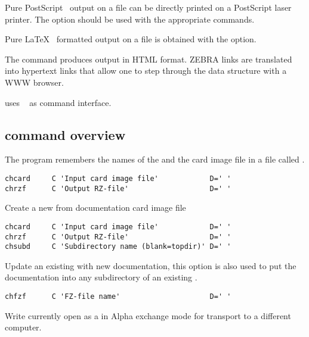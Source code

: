 \begin{ULc}
\item Pure PostScript~\cite{Adobe:red2} output on a file  can be
      directly printed on a PostScript laser printer.
      The  option should be used with the appropriate commands.
\item Pure \LaTeX~\cite{bib-LATEX} formatted output on a file  
      is obtained with the  option.
\item The command  produces output in HTML format.
      ZEBRA links are translated into hypertext links that allow one
      to step through the data structure with a WWW browser. 
\end{ULc}
 
 uses ~\cite{bib-KUIP} as command interface. 
 
\subsection[{\tt DZEDIT} command overview]{ command overview}
The program remembers the names of the \RZfile{} and the card image
file in a file called .
 
 
\begin{verbatim}
chcard     C 'Input card image file'            D=' '
chrzf      C 'Output RZ-file'                   D=' '
\end{verbatim}
 
Create a new \RZfile{} from documentation card image file
 
 
\begin{verbatim}
chcard     C 'Input card image file'            D=' '
chrzf      C 'Output RZ-file'                   D=' '
chsubd     C 'Subdirectory name (blank=topdir)' D=' '
\end{verbatim}
 
Update an existing \RZfile{} with new documentation, this option
is also used to put the documentation into any subdirectory
of an existing \RZfile.
 
 
\begin{verbatim}
chfzf      C 'FZ-file name'                     D=' '
\end{verbatim}
 
Write currently open \RZfile{} as a \FZfile{} in Alpha exchange mode for
transport to a different computer.
 
